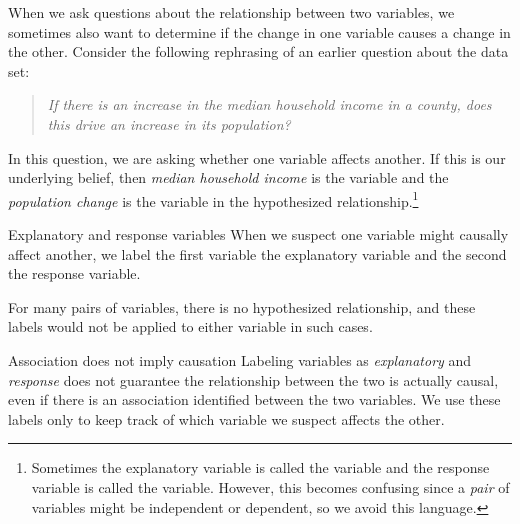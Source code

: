 When we ask questions about the relationship
between two variables, we sometimes also want to determine
if the change in one variable causes a change in the other.
Consider the following rephrasing of an earlier question
about the  data set:
\begin{quote}\em
  If there is an increase in the median household income
  in a county, does this drive an increase in its population?
\end{quote}
In this question, we are asking whether one variable
affects another.
If this is our underlying belief,
then \emph{median household income} is the
variable and the \emph{population change} is the
 variable
in the hypothesized relationship.\footnote{Sometimes
  the explanatory variable is called the 
  variable and the response variable is called the
   variable.
  However, this becomes confusing since a \emph{pair}
  of variables might be independent or dependent,
  so we avoid this language.}


\begin{onebox}{Explanatory and response variables}
When we suspect one variable might causally affect another,
we label the first variable the explanatory variable and the
second the response variable.
\vspace{1mm}

\hspace{10mm}

For many pairs of variables, there is no hypothesized
relationship, and these labels would not be applied to
either variable in such cases.
\end{onebox}

\begin{onebox}{Association does not imply causation}
{Labeling variables as \emph{explanatory} and \emph{response} does not guarantee the relationship between the two is actually causal, even if there is an association identified between the two variables. We use these labels only to keep track of which variable we suspect affects the other.}
\end{onebox}

